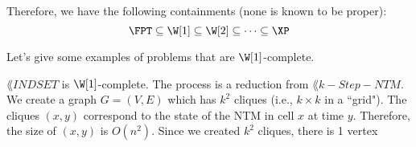 Therefore, we have the following containments (none is known to be proper):
\[
\FPT \subseteq \W[1] \subseteq \W[2] \subseteq \cdots \subseteq \XP
\]

Let's give some examples of problems that are $\W[1]$-complete. 

\begin{example}
$\lang{INDSET}$ is $\W[1]$-complete. The process is a reduction from $\lang{k-Step-NTM}$. We create a graph $G = (V, E)$ which has $k^2$ cliques (i.e., $k \times k$ in a ``grid"). The cliques $(x, y)$ correspond to the state of the NTM in cell $x$ at time $y$. Therefore, the size of $(x, y)$ is $O(n^2)$. Since we created $k^2$ cliques, there is 1 vertex 
\end{example}